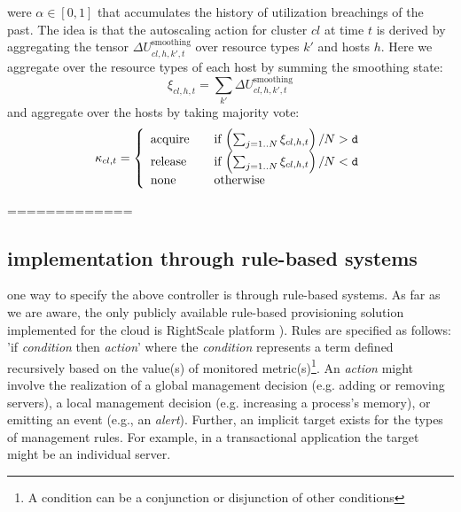    were $\alpha\in[0,1]$  that accumulates the history of utilization breachings of the past.
 The idea is that the autoscaling action for cluster $cl$ at time $t$ is derived by aggregating the tensor $\Delta U^\text{smoothing}_{cl,h,k',t}$ over resource types $k'$  and hosts $h$. Here we aggregate over the resource types of each host by summing the smoothing state:   
\[
\xi_{cl,h,t}=\sum_{k'} \Delta U^\text{smoothing}_{cl,h,k',t} 
\]   
 and aggregate over the hosts  by taking  majority vote: %
\[
  \kappa_{cl,t} = \left\{    
  \begin{array}{l l}
    \text{acquire} & \quad \text{if $\left(\sum_{j=1..N} \xi_{cl,h,t}\right)/N > \mathtt{d}$}\\
    \text{release} & \quad \text{if $\left(\sum_{j=1..N} \xi_{cl,h,t}\right)/N < \mathtt{d}$}\\
    \text{none} & \quad \text{otherwise} 
  \end{array} \right. 
\]

=============
\subsection{implementation through rule-based systems}
one way to specify the above controller is through rule-based systems.
As far as we are aware, the only publicly available rule-based provisioning solution implemented for the cloud is RightScale platform \cite{rightscale_autoscaling}).
Rules are specified as follows:  'if \textit{condition} then \textit{action}' where the \textit{condition} represents a term defined recursively based on the value(s) of monitored metric(s)\footnote{A condition can be a conjunction or disjunction of other conditions}.   
An \textit{action} might involve the realization of a global management decision (e.g. adding or removing servers), a local management decision  (e.g. increasing a process's memory), or emitting an event (e.g.,  an {\it alert}). 
Further, an implicit target exists for the types of  management rules.  For example, in a transactional application the target might be an individual server. %

